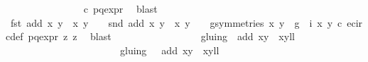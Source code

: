 \begin{isabellebody}
\ \ \ \ \ \ \ \ \ \ \ \ \ \ \isamarkupfalse%
\ c{\isacharparenleft}{}{\isacharparenright}\ p{\isacharunderscore}q{\isacharunderscore}expr{\isacharparenleft}{}{\isacharparenright}\ \isamarkupfalse%
\ blast\ \ \isanewline
\ \ \ \ \ \ \ \ \ \ \ \ \ \ \isamarkupfalse%
\ {\isacartoucheopen}fst\ {\isacharparenleft}add\ {\isacharparenleft}x{\isacharcomma}\ y{\isacharparenright}\ {\isacharparenleft}{\isasymtau}\ {\isacharparenleft}x{\isacharprime}{\isacharcomma}\ y{\isacharprime}{\isacharparenright}{\isacharparenright}{\isacharparenright}\ {\isacharequal}\ {}\ {\isasymor}\ snd\ {\isacharparenleft}add\ {\isacharparenleft}x{\isacharcomma}\ y{\isacharparenright}\ {\isacharparenleft}{\isasymtau}\ {\isacharparenleft}x{\isacharprime}{\isacharcomma}\ y{\isacharprime}{\isacharparenright}{\isacharparenright}{\isacharparenright}\ {\isacharequal}\ {}\ {\isasymLongrightarrow}\ {\isasymexists}g{\isasymin}symmetries{\isachardot}\ {\isacharparenleft}x{\isacharprime}{\isacharcomma}\ y{\isacharprime}{\isacharparenright}\ {\isacharequal}\ {\isacharparenleft}g\ {\isasymcirc}\ i{\isacharparenright}\ {\isacharparenleft}x{\isacharcomma}\ y{\isacharparenright}{\isacartoucheclose}\ c{\isacharparenleft}{}{\isacharparenright}\ e{\isacharunderscore}circ{\isacharunderscore}def\ p{\isacharunderscore}q{\isacharunderscore}expr{\isacharparenleft}{}{\isacharparenright}\ z{}{\isacharparenleft}{}{\isacharparenright}\ z{}{\isacharparenleft}{}{\isacharparenright}\ \isamarkupfalse%
\ blast\ \isanewline
\ \ \ \ \ \ \ \ \ \ \ \ \isamarkupfalse%
\ \isamarkupfalse%
\ {}{\isacharcolon}\ {\isachardoublequoteopen}gluing\ {\isacharbackquote}{\isacharbackquote}\ {\isacharbraceleft}{\isacharparenleft}{\isacharparenleft}add\ {\isacharparenleft}x{\isacharcomma}y{\isacharparenright}\ {\isacharparenleft}{\isasymtau}\ {\isacharparenleft}x{\isacharprime}{\isacharcomma}y{\isacharprime}{\isacharparenright}{\isacharparenright}{\isacharparenright}{\isacharcomma}l{\isacharplus}l{\isacharprime}{\isacharplus}{}{\isacharparenright}{\isacharbraceright}\ {\isacharequal}\isanewline
\ \ \ \ \ \ \ \ \ \ \ \ \ \ \ \ \ \ \ \ \ \ \ gluing\ {\isacharbackquote}{\isacharbackquote}\ {\isacharbraceleft}{\isacharparenleft}{\isasymtau}\ {\isacharparenleft}add\ {\isacharparenleft}x{\isacharcomma}y{\isacharparenright}\ {\isacharparenleft}{\isasymtau}\ {\isacharparenleft}x{\isacharprime}{\isacharcomma}y{\isacharprime}{\isacharparenright}{\isacharparenright}{\isacharparenright}{\isacharcomma}l{\isacharplus}l{\isacharprime}{\isacharparenright}{\isacharbraceright}{\isachardoublequoteclose}\isanewline

\end{isabellebody}
